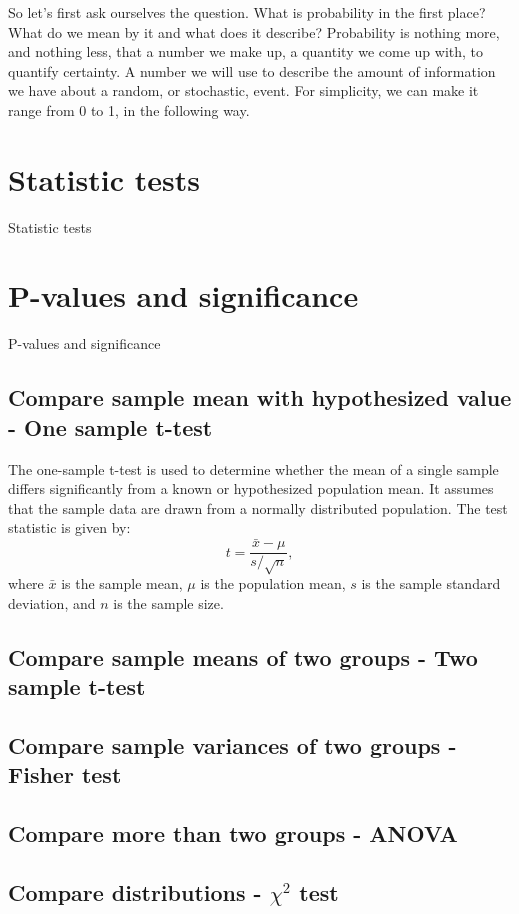 \documentclass{book}
\begin{document}
So let's first ask ourselves the question. What is probability in the first place? What do we mean by it and what does it describe? Probability is nothing more, and nothing less, that a number we make up, a quantity we come up with, to quantify certainty. A number we will use to describe the amount of information we have about a random, or stochastic, event. For simplicity, we can make it range from 0 to 1, in the following way.

\section{Statistic tests}
Statistic tests

\section{P-values and significance}
P-values and significance

\subsection*{Compare sample mean with hypothesized value - One sample t-test}

The one-sample t-test is used to determine whether the mean of a single sample differs significantly from a known or hypothesized population mean. It assumes that the sample data are drawn from a normally distributed population. The test statistic is given by:
\[
    t = \frac{\bar{x} - \mu}{s / \sqrt{n}},
\]
where $\bar{x}$ is the sample mean, $\mu$ is the population mean, $s$ is the sample standard deviation, and $n$ is the sample size.
\newpage

\subsection*{Compare sample means of two groups - Two sample t-test}

\subsection*{Compare sample variances of two groups - Fisher test}

\subsection*{Compare more than two groups - ANOVA}

\subsection*{Compare distributions - $\chi^{2}$ test}
\end{document}
